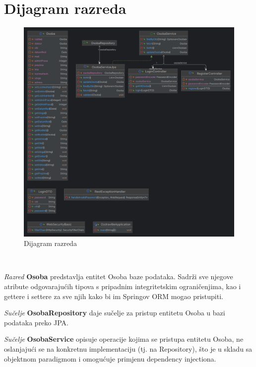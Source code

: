			\eject
			
			
		\section{Dijagram razreda}
		
			\begin{figure}[H]
				\includegraphics[width=\textwidth]{dijagrami/classDiagram1.png} %
				\caption{Dijagram razreda}
				\label{fig:promjene10} %
			\end{figure}
			\

			\textit{Razred }\textbf{Osoba}
			 predstavlja entitet Osoba baze podataka. 
			Sadrži sve njegove atribute odgovarajućih tipova s pripadnim integritetskim ograničenjima, kao i gettere i settere za sve njih kako bi im Springov ORM mogao pristupiti.

			\textit{Sučelje }\textbf{OsobaRepository}
			 daje sučelje za pristup entitetu Osoba u bazi podataka preko JPA.

			\textit{Sučelje }\textbf{OsobaService}
			 opisuje operacije kojima se pristupa entitetu Osoba, 
			ne oslanjajući se na konkretnu implementaciju (tj. na Repository),
			što je u skladu sa objektnom paradigmom i omogućuje primjenu dependency injectiona.
			
